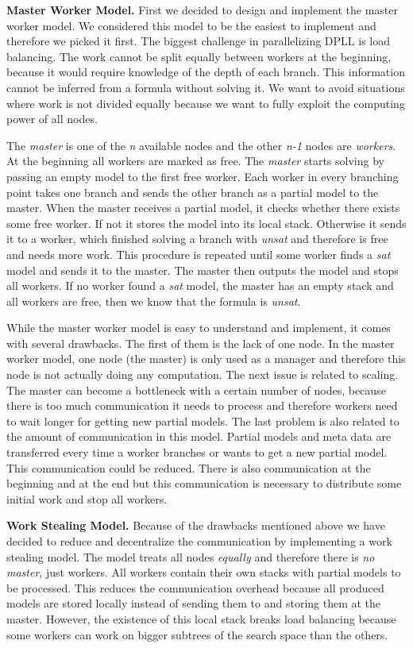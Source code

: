 \documentclass[letterpaper]{article}
\newcommand{\mypar}[1]{{\bf #1.}}
\begin{document}
\mypar{Master Worker Model}
First we decided to design and implement the master worker model.
We considered this model to be the easiest to implement and therefore we picked it first.
The biggest challenge in parallelizing DPLL is load balancing.
The work cannot be split equally between workers at the beginning, because it would require knowledge of the depth of each branch.
This information cannot be inferred from a formula without solving it.
We want to avoid situations where work is not divided equally because we want to fully exploit the computing power of all nodes.

The \textit{master} is one of the \textit{n} available nodes and the other \textit{n-1} nodes are \textit{workers}.
At the beginning all workers are marked as free.
The \textit{master} starts solving by passing an empty model to the first free worker.
Each worker in every branching point takes one branch and sends the other branch as a partial model to the master.
When the master receives a partial model, it checks whether there exists some free worker.
If not it stores the model into its local stack.
Otherwise it sends it to a worker, which finished solving a branch with \textit{unsat} and therefore is free and needs more work.
This procedure is repeated until some worker finds a \textit{sat} model and sends it to the master.
The master then outputs the model and stops all workers.
If no worker found a \textit{sat} model, the master has an empty stack and all workers are free, then we know that the formula is \textit{unsat}.

While the master worker model is easy to understand and implement, it comes with several drawbacks.
The first of them is the lack of one node.
In the master worker model, one node (the master) is only used as a manager and therefore this node is not actually doing any computation.
The next issue is related to scaling.
The master can become a bottleneck with a certain number of nodes, because there is too much communication it needs to process and therefore workers need to wait longer for getting new partial models.
The last problem is also related to the amount of communication in this model.
Partial models and meta data are transferred every time a worker branches or wants to get a new partial model.
This communication could be reduced.
There is also communication at the beginning and at the end but this communication is necessary to distribute some initial work and stop all workers.

\mypar{Work Stealing Model}
Because of the drawbacks mentioned above we have decided to reduce and decentralize the communication by implementing a work stealing model.
The model treats all nodes \textit{equally} and therefore there is \textit{no master}, just workers.
All workers contain their own stacks with partial models to be processed.
This reduces the communication overhead because all produced models are stored locally instead of sending them to and storing them at the master.
However, the existence of this local stack breaks load balancing because some workers can work on bigger subtrees of the search space than the others.
\end{document}
